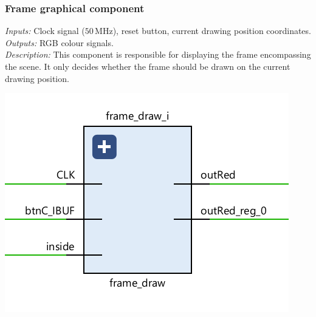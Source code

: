 \documentclass[11pt,a4paper]{article}
\def\MHz{\,\mathrm{MHz}}
\begin{document}
        \subsubsection*{Frame graphical component}
        \begin{minipage}{.45\textwidth}
            \emph{Inputs:} Clock signal ($50\MHz$), reset button, current drawing position coordinates.\\[1em]
            \emph{Outputs:} RGB colour signals.\\[1em]
            \emph{Description:} This component is responsible for displaying the frame encompassing the scene. It only decides whether the frame should be drawn on the current drawing position.
        \end{minipage}
        \hfill
        \begin{minipage}{.45\textwidth}
            \includegraphics[width=\textwidth]{src/frame-draw.png}
        \end{minipage}
\end{document}
